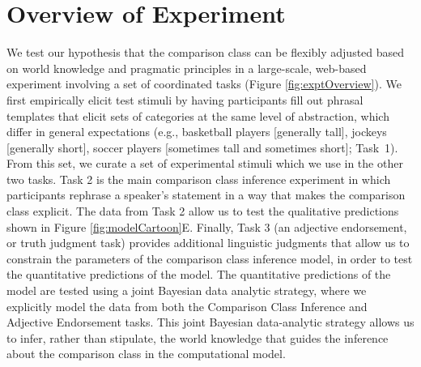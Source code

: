 \documentclass[doc]{apa6}
\begin{document}
%  



\section{Overview of Experiment}


We test our hypothesis that the comparison class can be flexibly adjusted based on world knowledge and pragmatic principles in a large-scale, web-based experiment involving a set of coordinated tasks (Figure \ref{fig:exptOverview}).
We first empirically elicit test stimuli by having participants fill out phrasal templates that elicit sets of categories at the same level of abstraction, which differ in general expectations (e.g., basketball players [generally tall], jockeys [generally short], soccer players [sometimes tall and sometimes short]; Task~1). 
From this set, we curate a set of experimental stimuli which we use in the other two tasks.
Task 2 is the main comparison class inference experiment in which participants rephrase a speaker's statement in a way that makes the comparison class explicit.
The data from Task 2 allow us to test the qualitative predictions shown in Figure \ref{fig:modelCartoon}E.
Finally, Task 3 (an adjective endorsement, or truth judgment task) provides additional linguistic judgments that allow us to constrain the parameters of the comparison class inference model, in order to test the quantitative predictions of the model. 
The quantitative predictions of the model are tested using a joint Bayesian data analytic strategy, where we explicitly model the data from both the Comparison Class Inference and Adjective Endorsement tasks.
This joint Bayesian data-analytic strategy allows us to infer, rather than stipulate, the world knowledge that guides the inference about the comparison class in the computational model. 
\end{document}
